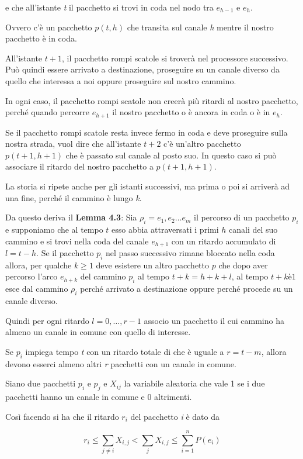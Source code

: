 e che all'istante \emph{t} il pacchetto si trovi in coda nel nodo tra $e_{h-1}$ e $e_h$.

Ovvero c'è un pacchetto $p(t,h)$ che transita sul canale \emph{h} mentre il nostro pacchetto è in coda.

All'istante $t+1$, il pacchetto rompi scatole si troverà nel processore successivo. 
Può quindi essere arrivato a destinazione, proseguire su un canale diverso da quello che interessa a noi oppure proseguire sul nostro cammino.

In ogni caso, il pacchetto rompi scatole non creerà più ritardi al nostro pacchetto, perché quando percorre $e_{h+1}$ il nostro pacchetto o è ancora in coda o è in $e_h$. 

Se il pacchetto rompi scatole resta invece fermo in coda e deve proseguire sulla nostra strada, vuol dire che all'istante $t+2$ c'è un'altro pacchetto $p(t+1, h+1)$ che è passato sul canale al posto suo. 
In questo caso si può associare il ritardo del nostro pacchetto a $p(t+1, h+1)$.

La storia si ripete anche per gli istanti successivi, ma prima o poi si arriverà ad una fine, perché il cammino è lungo \emph{k}.

Da questo deriva il \textbf{Lemma 4.3}: Sia $\rho_i = e_1, e_2 \ldots e_m$ il percorso di un pacchetto $p_i$ e supponiamo che al tempo $t$ esso abbia attraversati i primi $h$ canali del suo cammino e si trovi nella coda del canale $e_{h+1}$ con un ritardo accumulato di $l = t-h$. Se il pacchetto $p_i$ nel passo successivo rimane bloccato nella coda allora, per qualche $k\geq 1$ deve esistere un altro pacchetto $p$ che dopo aver percorso l'arco $e_{h+k}$ del cammino $p_i$ al tempo $t+k = h+k+l$, al tempo $t+kè1$ esce dal cammino $\rho_i$ perché arrivato a destinazione oppure perché procede su un canale diverso.

Quindi per ogni ritardo $l = 0, \ldots, r-1$ associo un pacchetto il cui cammino ha almeno un canale in comune con quello di interesse.

Se $p_i$ impiega tempo \emph{t} con un ritardo totale di che è uguale a $r = t -m$, allora devono esserci almeno altri \emph{r} pacchetti con un canale in comune.

Siano due pacchetti $p_i$ e $p_j$ e $X_{ij}$ la variabile aleatoria che vale 1 se i due pacchetti hanno un canale in comune e 0 altrimenti.

Così facendo si ha che il ritardo $r_i$ del pacchetto \emph{i} è dato da

$$
r_i \leq \sum\limits_{j \neq i} X_{i,j} < \sum\limits_{j} X_{i,j} \leq \sum\limits_{i = 1}^{n} P(e_i)
$$

